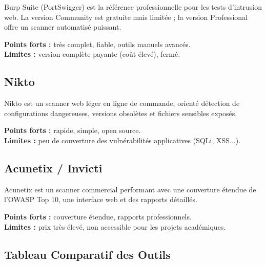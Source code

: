 \documentclass[12pt, a4paper]{report}
\begin{document}
Burp Suite (PortSwigger) est la référence professionnelle pour les tests
d'intrusion web. La version Community est gratuite mais limitée ; la version
Professional offre un scanner automatisé puissant.

\textbf{Points forts :} très complet, fiable, outils manuels avancés.\\
\textbf{Limites :} version complète payante (coût élevé), fermé.

\subsection{Nikto}

Nikto est un scanner web léger en ligne de commande, orienté détection de
configurations dangereuses, versions obsolètes et fichiers sensibles exposés.

\textbf{Points forts :} rapide, simple, open source.\\
\textbf{Limites :} peu de couverture des vulnérabilités applicatives (SQLi, XSS...).

\subsection{Acunetix / Invicti}

Acunetix est un scanner commercial performant avec une couverture étendue de
l'OWASP Top 10, une interface web et des rapports détaillés.

\textbf{Points forts :} couverture étendue, rapports professionnels.\\
\textbf{Limites :} prix très élevé, non accessible pour les projets académiques.

\subsection{Tableau Comparatif des Outils}
\end{document}
